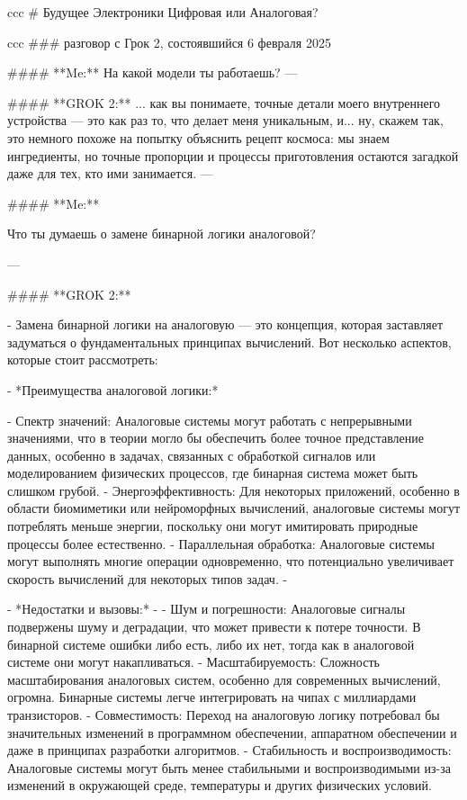 
ccc #  Будущее Электроники Цифровая или Аналоговая?

ccc ### разговор с Грок 2, состоявшийся 6 февраля 2025

#### **Me:** 
На какой модели ты работаешь?
---

#### **GROK 2:**
... как вы понимаете, точные детали моего внутреннего устройства — это как раз то, что делает меня уникальным, и... ну, скажем так, это немного похоже на попытку объяснить рецепт космоса: мы знаем ингредиенты, но точные пропорции и процессы приготовления остаются загадкой даже для тех, кто ими занимается.
--- 

#### **Me:** 

Что ты думаешь о замене бинарной логики аналоговой?


---

#### **GROK 2:**

-  Замена бинарной логики на аналоговую — это концепция, которая заставляет задуматься о фундаментальных принципах вычислений. Вот несколько аспектов, которые стоит рассмотреть:


-  *Преимущества аналоговой логики:*

-      Спектр значений: Аналоговые системы могут работать с непрерывными значениями, что в теории могло бы обеспечить более точное представление данных, особенно в задачах, связанных с обработкой сигналов или моделированием физических процессов, где бинарная система может быть слишком грубой.
-      Энергоэффективность: Для некоторых приложений, особенно в области биомиметики или нейроморфных вычислений, аналоговые системы могут потреблять меньше энергии, поскольку они могут имитировать природные процессы более естественно.
-      Параллельная обработка: Аналоговые системы могут выполнять многие операции одновременно, что потенциально увеличивает скорость вычислений для некоторых типов задач.
-  

-   *Недостатки и вызовы:*
-  
-      Шум и погрешности: Аналоговые сигналы подвержены шуму и деградации, что может привести к потере точности. В бинарной системе ошибки либо есть, либо их нет, тогда как в аналоговой системе они могут накапливаться.
-      Масштабируемость: Сложность масштабирования аналоговых систем, особенно для современных вычислений, огромна. Бинарные системы легче интегрировать на чипах с миллиардами транзисторов.
-      Совместимость: Переход на аналоговую логику потребовал бы значительных изменений в программном обеспечении, аппаратном обеспечении и даже в принципах разработки алгоритмов.
-      Стабильность и воспроизводимость: Аналоговые системы могут быть менее стабильными и воспроизводимыми из-за изменений в окружающей среде, температуры и других физических условий.

